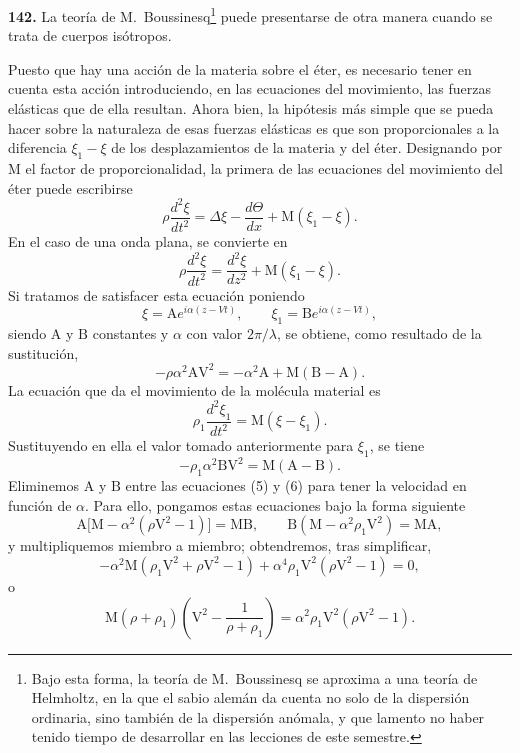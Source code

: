 \noindent\textbf{142.} La teoría de M.~Boussinesq\footnote{Bajo esta forma, la
teoría de M.~Boussinesq se aproxima a una teoría de Helmholtz, en la que
el sabio alemán da cuenta no solo de la dispersión ordinaria, sino también
de la dispersión anómala, y que lamento no haber tenido tiempo de
desarrollar en las lecciones de este semestre.} puede presentarse de otra
manera cuando se trata de cuerpos isótropos.

Puesto que hay una acción de la materia sobre el éter, es necesario tener
en cuenta esta acción introduciendo, en las ecuaciones del movimiento, las
fuerzas elásticas que de ella resultan. Ahora bien, la hipótesis más
simple que se pueda hacer sobre la naturaleza de esas fuerzas elásticas es
que son proporcionales a la diferencia $\xi_1-\xi$ de los desplazamientos
de la materia y del éter. Designando por $\mathrm M$ el factor de
proporcionalidad, la primera de las ecuaciones del movimiento del éter
puede escribirse
\[
\rho\frac{d^2\xi}{dt^2}=\Delta\xi-\frac{d\Theta}{dx}+\mathrm M(\xi_1-\xi).
\]
En el caso de una onda plana, se convierte en
\[
\rho\frac{d^2\xi}{dt^2}=\frac{d^2\xi}{dz^2}+\mathrm M(\xi_1-\xi).
\]
Si tratamos de satisfacer esta ecuación poniendo
\[
\xi=\mathrm Ae^{i\alpha(z-Vt)},\qquad \xi_1=\mathrm Be^{i\alpha(z-Vt)},
\]
siendo $\mathrm A$ y $\mathrm B$ constantes y $\alpha$ con valor
$2\pi/\lambda$, se obtiene, como resultado de la sustitución,
\begin{equation}
-\rho\alpha^2\mathrm A\mathrm V^2=-\alpha^2\mathrm A+\mathrm M(\mathrm B-\mathrm A).
\tag{5}
\end{equation}
La ecuación que da el movimiento de la molécula material es
\[
\rho_1\frac{d^2\xi_1}{dt^2}=\mathrm M(\xi-\xi_1).
\]
Sustituyendo en ella el valor tomado anteriormente para $\xi_1$, se tiene
\begin{equation}
-\rho_1\alpha^2\mathrm B\mathrm V^2=\mathrm M(\mathrm A-\mathrm B).
\tag{6}
\end{equation}
Eliminemos $\mathrm A$ y $\mathrm B$ entre las ecuaciones (5) y (6) para
tener la velocidad en función de $\alpha$. Para ello, pongamos estas
ecuaciones bajo la forma siguiente
\[
\mathrm A\bigl[\mathrm M-\alpha^2(\rho\mathrm V^2-1)\bigr]=\mathrm{MB},\qquad
\mathrm B(\mathrm M-\alpha^2\rho_1\mathrm V^2)=\mathrm{MA},
\]
y multipliquemos miembro a miembro; obtendremos, tras simplificar,
\[
-\alpha^2\mathrm M(\rho_1\mathrm V^2+\rho\mathrm V^2-1)
+\alpha^4\rho_1\mathrm V^2(\rho\mathrm V^2-1)=0,
\]
o
\[
\mathrm M(\rho+\rho_1)\left(\mathrm V^2-\frac{1}{\rho+\rho_1}\right)
=\alpha^2\rho_1\mathrm V^2(\rho\mathrm V^2-1).
\]
